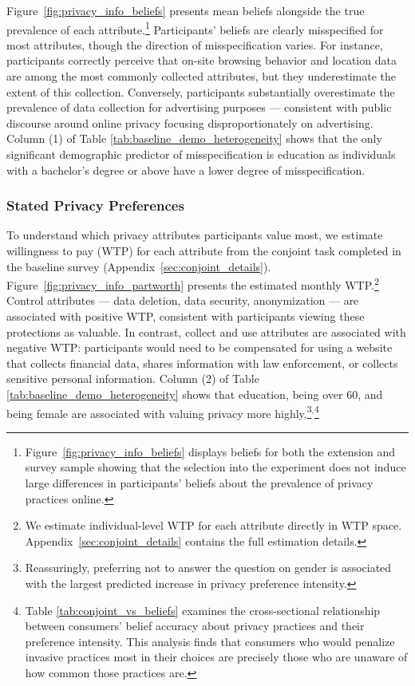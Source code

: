 \documentclass[12pt]{article}
\theoremstyle{definition}
\theoremstyle{remark}
\begin{document}
Figure~\ref{fig:privacy_info_beliefs} presents mean beliefs alongside the true prevalence of each attribute.\footnote{Figure~\ref{fig:privacy_info_beliefs} displays beliefs for both the extension and survey sample showing that the selection into the experiment does not induce large differences in participants' beliefs about the prevalence of privacy practices online.} Participants' beliefs are clearly misspecified for most attributes, though the direction of misspecification varies. For instance, participants correctly perceive that on-site browsing behavior and location data are among the most commonly collected attributes, but they underestimate the extent of this collection. Conversely, participants substantially overestimate the prevalence of data collection for advertising purposes --- consistent with public discourse around online privacy focusing disproportionately on advertising. Column (1) of Table \ref{tab:baseline_demo_heterogeneity} shows that the only significant demographic predictor of misspecification is education as individuals with a bachelor's degree or above have a lower degree of misspecification.

\subsubsection{Stated Privacy Preferences}\label{subsec:stated_privacy_prefs}

To understand which privacy attributes participants value most, we estimate willingness to pay (WTP) for each attribute from the conjoint task completed in the baseline survey (Appendix~\ref{sec:conjoint_details}). Figure~\ref{fig:privacy_info_partworth} presents the estimated monthly WTP.\footnote{We estimate individual-level WTP for each attribute directly in WTP space. Appendix~\ref{sec:conjoint_details} contains the full estimation details.} Control attributes --- data deletion, data security, anonymization --- are associated with positive WTP, consistent with participants viewing these protections as valuable. In contrast, collect and use attributes are associated with negative WTP: participants would need to be compensated for using a website that collects financial data, shares information with law enforcement, or collects sensitive personal information. Column (2) of Table \ref{tab:baseline_demo_heterogeneity} shows that education, being over 60, and being female are associated with valuing privacy more highly.\footnote{Reassuringly, preferring not to answer the question on gender is associated with the largest predicted increase in privacy preference intensity.}$^{,}$\footnote{Table \ref{tab:conjoint_vs_beliefs} examines the cross-sectional relationship between consumers' belief accuracy about privacy practices and their preference intensity. This analysis finds that consumers who would penalize invasive practices most in their choices are precisely those who are unaware of how common those practices are.}
\end{document}
